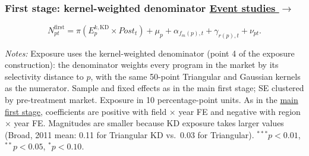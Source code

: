 \documentclass{beamer}
\begin{document}
\begin{frame}[label=sua-kd-first-stage]

\frametitle{
    First stage: kernel-weighted denominator
    \hfill
    \hyperlink{sua-kd-event-studies}{\scriptsize\color{blue}Event studies $\rightarrow$}
}

\centering

{\small
\begin{equation*}
N^{\mathrm{first}}_{pt}
=
\pi
\left(
E^{k,\mathrm{KD}}_{p}\times Post_t
\right)
+\mu_p
+\alpha_{f_m(p),t}
+\gamma_{r(p),t}
+\nu_{pt}.
\end{equation*}
}

\vspace{-0.2cm}

\resizebox{0.66\textwidth}{!}{}

\vspace{0.08cm}

\parbox{0.97\textwidth}{%
\tiny
\textit{Notes:}
Exposure uses the kernel-weighted denominator (point 4 of the exposure construction): the denominator weights every program in the market by its selectivity distance to $p$, with the same 50-point Triangular and Gaussian kernels as the numerator. Sample and fixed effects as in the main first stage; SE clustered by pre-treatment market.
Exposure in 10 percentage-point units. As in the
\hyperlink{sua-first-stage}{\color{blue}main first stage}, coefficients are
positive with field $\times$ year FE and negative with region $\times$ year FE.
Magnitudes are smaller because KD exposure takes larger values (Broad, 2011
mean: 0.11 for Triangular KD vs.\ 0.03 for Triangular).
$^{***}p<0.01$, $^{**}p<0.05$, $^{*}p<0.10$.
}

\end{frame}
\end{document}
